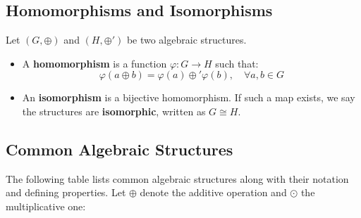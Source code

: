 \subsection{Homomorphisms and Isomorphisms}

Let $(G, \oplus)$ and $(H, \oplus')$ be two algebraic structures.

\begin{itemize}
    \item A \textbf{homomorphism} is a function $\varphi: G \rightarrow H$ such that:
    \[
    \varphi(a \oplus b) = \varphi(a) \oplus' \varphi(b), \quad \forall a,b \in G
    \]
    
    \item An \textbf{isomorphism} is a bijective homomorphism. If such a map exists, we say the structures are \textbf{isomorphic}, written as $G \cong H$.
\end{itemize}

\subsection{Common Algebraic Structures}

The following table lists common algebraic structures along with their notation and defining properties. Let $\oplus$ denote the additive operation and $\odot$ the multiplicative one:

